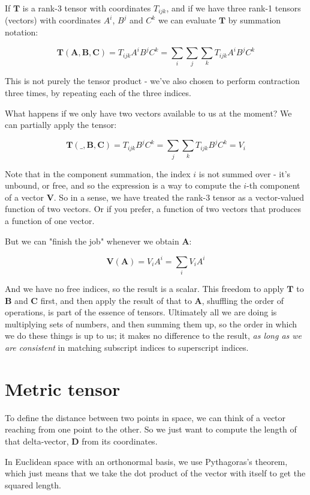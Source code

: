 If $\boldsymbol{T}$ is a rank-3 tensor with coordinates $T_{ijk}$, and if we have three rank-1 tensors (vectors) with coordinates $A^i$, $B^j$ and $C^k$ we can evaluate $\boldsymbol{T}$ by summation notation:

$$
\boldsymbol{T(A,B,C)}
= T_{ijk}A^iB^jC^k
= \sum_i\sum_j\sum_kT_{ijk}A^iB^jC^k
$$

This is not purely the tensor product - we've also chosen to perform contraction three times, by repeating each of the three indices.

What happens if we only have two vectors available to us at the moment? We can partially apply the tensor:

$$
\boldsymbol{T(\_,B,C)}
= T_{ijk}B^jC^k
= \sum_j\sum_kT_{ijk}B^jC^k
= V_i
$$

Note that in the component summation, the index $i$ is not summed over - it's unbound, or free, and so the expression is a way to compute the $i$-th component of a vector $\boldsymbol{V}$. So in a sense, we have treated the rank-3 tensor as a vector-valued function of two vectors. Or if you prefer, a function of two vectors that produces a function of one vector.

But we can "finish the job" whenever we obtain $\boldsymbol{A}$:

$$
\boldsymbol{V(A)}
= V_{i}A^i
= \sum_i{V_iA^i}
$$

And we have no free indices, so the result is a scalar. This freedom to apply $\boldsymbol{T}$ to $\boldsymbol{B}$ and $\boldsymbol{C}$ first, and then apply the result of that to $\boldsymbol{A}$, shuffling the order of operations, is part of the essence of tensors. Ultimately all we are doing is multiplying sets of numbers, and then summing them up, so the order in which we do these things is up to us; it makes no difference to the result, \textit{as long as we are consistent} in matching subscript indices to superscript indices.

\section{Metric tensor}

To define the distance between two points in space, we can think of a vector reaching from one point to the other. So we just want to compute the length of that delta-vector, $\boldsymbol{D}$ from its coordinates.

In Euclidean space with an orthonormal basis, we use Pythagoras's theorem, which just means that we take the dot product of the vector with itself to get the squared length.

